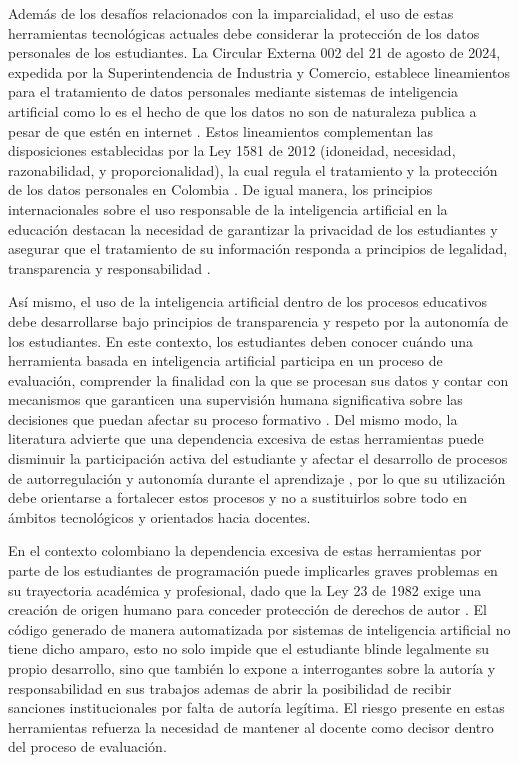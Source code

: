 \documentclass[letterpaper, 10 pt, conference]{ieeeconf}
\begin{document}
Además de los desafíos relacionados con la imparcialidad, el uso de estas herramientas tecnológicas actuales debe considerar la protección de los datos personales de los estudiantes. La Circular Externa 002 del 21 de agosto de 2024, expedida por la Superintendencia de Industria y Comercio, establece lineamientos para el tratamiento de datos personales mediante sistemas de inteligencia artificial como lo es el hecho de que los datos no son de naturaleza publica a pesar de que estén en internet \cite{2}. Estos lineamientos complementan las disposiciones establecidas por la Ley 1581 de 2012 (idoneidad, necesidad, razonabilidad, y proporcionalidad), la cual regula el tratamiento y la protección de los datos personales en Colombia \cite{3}. De igual manera, los principios internacionales sobre el uso responsable de la inteligencia artificial en la educación destacan la necesidad de garantizar la privacidad de los estudiantes y asegurar que el tratamiento de su información responda a principios de legalidad, transparencia y responsabilidad \cite{14}. 

Así mismo, el uso de la inteligencia artificial dentro de los procesos educativos debe desarrollarse bajo principios de transparencia y respeto por la autonomía de los estudiantes. En este contexto, los estudiantes deben conocer cuándo una herramienta basada en inteligencia artificial participa en un proceso de evaluación, comprender la finalidad con la que se procesan sus datos y contar con mecanismos que garanticen una supervisión humana significativa sobre las decisiones que puedan afectar su proceso formativo \cite{14}. Del mismo modo, la literatura advierte que una dependencia excesiva de estas herramientas puede disminuir la participación activa del estudiante y afectar el desarrollo de procesos de autorregulación y autonomía durante el aprendizaje \cite{15}, por lo que su utilización debe orientarse a fortalecer estos procesos y no a sustituirlos sobre todo en ámbitos tecnológicos y orientados hacia docentes.

En el contexto colombiano la dependencia excesiva de estas herramientas por parte de los estudiantes de programación puede implicarles graves problemas en su trayectoria académica y profesional, dado que la Ley 23 de 1982 exige una creación de origen humano para conceder protección de derechos de autor \cite{20}. El código generado de manera automatizada por sistemas de inteligencia artificial no tiene dicho amparo, esto no solo impide que el estudiante blinde legalmente su propio desarrollo, sino que también lo expone a interrogantes sobre la autoría y responsabilidad en sus trabajos ademas de abrir la posibilidad de recibir sanciones institucionales por falta de autoría legítima. El riesgo presente en estas herramientas refuerza la necesidad de mantener al docente como decisor dentro del proceso de evaluación.
\end{document}
